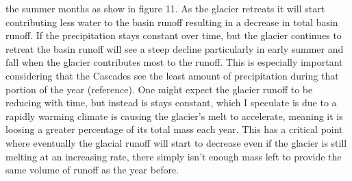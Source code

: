 \documentclass{article}
\begin{document}
the summer months as show in figure 11. As the glacier retreats it will start contributing less water to the basin runoff resulting in a decrease in total 
basin runoff. If the precipitation stays constant over time, but the glacier continues to retreat the basin runoff will see a steep decline 
particularly in early summer and fall when the glacier contributes most to the runoff. This is especially important considering that the 
Cascades see the least amount of precipitation during that portion of the year (reference). 
One might expect the glacier runoff to be reducing with time, but instead is stays constant, which I speculate is due to a 
rapidly warming climate is causing the glacier's melt to accelerate, meaning it is loosing a greater percentage of its total mass each year. 
This has a critical point where eventually the glacial runoff will start to decrease even if the glacier is still melting at an increasing 
rate, there simply isn't enough mass left to provide the same volume of runoff as the year before.
\end{document}
